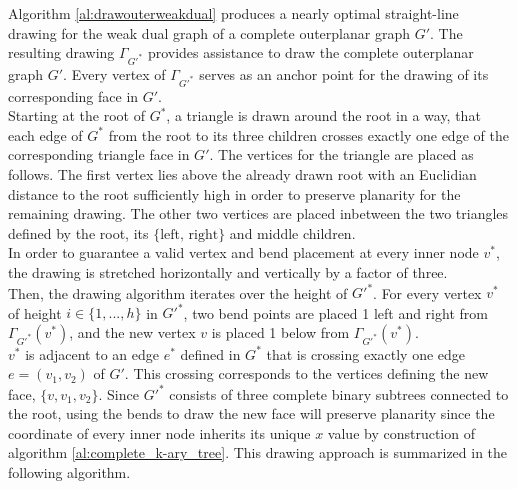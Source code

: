 Algorithm \ref{al:drawouterweakdual} produces a nearly optimal straight-line drawing for the weak dual graph of a complete outerplanar graph $G'$. The resulting drawing $\Gamma_{G'^*}$ provides assistance to draw the complete outerplanar graph $G'$. Every vertex of $\Gamma_{G'^*}$ serves as an anchor point for the drawing of its corresponding face in $G'$.\\
Starting at the root of $G^*$, a triangle is drawn around the root in a way, that each edge of $G^*$ from the root to its three children crosses exactly one edge of the corresponding triangle face in $G'$. The vertices for the triangle are placed as follows. The first vertex lies above the already drawn root with an Euclidian distance to the root sufficiently high in order to preserve planarity for the remaining drawing. The other two vertices are placed inbetween the two triangles defined by the root, its $\{\text{left, right}\}$ and middle children.\\
In order to guarantee a valid vertex and bend placement at every inner node $v^*$, the drawing is stretched horizontally and vertically by a factor of three.\\
Then, the drawing algorithm iterates over the height of $G'^*$. For every vertex $v^*$ of height $i\in \{1,...,h\}$ in $G'^*$, two bend points are placed 1 \UL left and right from $\Gamma_{G'^*}(v^*)$, and the new vertex $v$ is placed 1 \UL below from $\Gamma_{G'^*}(v^*)$.\\
$v^*$ is adjacent to an edge $e^*$ defined in $G^*$ that is crossing exactly one edge $e = (v_1,v_2)$ of $G'$. This crossing corresponds to the vertices defining the new face, $\{v, v_1, v_2\}$. Since $G'^*$ consists of three complete binary subtrees connected to the root, using the bends to draw the new face will preserve planarity since the coordinate of every inner node inherits its unique $x$ value by construction of algorithm \ref{al:complete_k-ary_tree}.
This drawing approach is summarized in the following algorithm.\\
